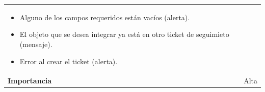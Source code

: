 \documentclass[
]{article}
\providecommand{\tightlist}{%
  \setlength{\itemsep}{0pt}\setlength{\parskip}{0pt}}
\begin{document}
\begin{longtable}[]{@{}ll@{}}
\begin{minipage}[t]{0.78\columnwidth}
\begin{itemize}
\tightlist
\item
  Alguno de los campos requeridos están vacíos (alerta).
\item
  El objeto que se desea integrar ya está en otro ticket de seguimieto
  (mensaje).
\item
  Error al crear el ticket (alerta).
\end{itemize}\strut
\end{minipage}\tabularnewline
\begin{minipage}[t]{0.16\columnwidth}\raggedright
\textbf{Importancia}\strut
\end{minipage} & \begin{minipage}[t]{0.78\columnwidth}\raggedright
Alta\strut
\end{minipage}\tabularnewline
\bottomrule
\end{longtable}
\end{document}

